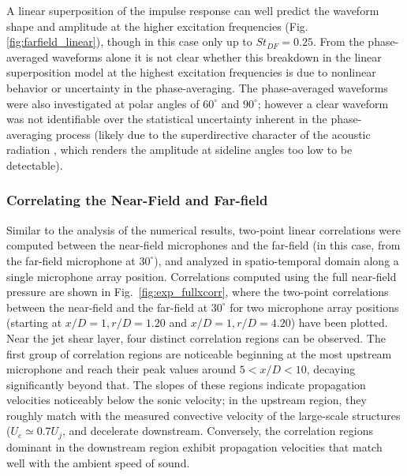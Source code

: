 \documentclass[english]{aiaa-tc}
\newcommand*{\fig}[1]{Fig.~\ref{#1}}
\begin{document}
A linear superposition of the impulse response can well predict the waveform shape and amplitude at the higher excitation frequencies (Fig. \ref{fig:farfield_linear}), though in this case only up to $St_{DF}  = 0.25$.
From the phase-averaged waveforms alone it is not clear whether this breakdown in the linear superposition model at the highest excitation frequencies is due to nonlinear behavior or uncertainty in the phase-averaging.
The phase-averaged waveforms were also investigated at polar angles of $60^\circ$ and $90^\circ$; however a clear waveform was not identifiable over the statistical uncertainty inherent in the phase-averaging process (likely due to the superdirective character of the acoustic radiation \cite{Crighton1990}, which renders the amplitude at sideline angles too low to be detectable).

\subsubsection{Correlating the Near-Field and Far-field}
Similar to the analysis of the numerical results, two-point linear correlations were computed between the near-field microphones and the far-field (in this case, from the far-field microphone at $30^{\circ}$), and analyzed in spatio-temporal domain along a single microphone array position.
Correlations computed using the full near-field pressure are shown in \fig{fig:exp_fullxcorr}, where the two-point correlations between the near-field and the far-field at $30^\circ$ for two microphone array positions (starting at $x/D = 1, r/D = 1.20$ and $x/D = 1, r/D = 4.20$) have been plotted.
Near the jet shear layer, four distinct correlation regions can be observed. 
The first group of correlation regions are noticeable beginning at the most upstream microphone and reach their peak values around $5 < x/D < 10$, decaying significantly beyond that.
The slopes of these regions indicate propagation velocities noticeably below the sonic velocity; in the upstream region, they roughly match with the measured convective velocity of the large-scale structures ($U_c \simeq 0.7 U_j$, and decelerate downstream.
Conversely, the correlation regions dominant in the downstream region exhibit propagation velocities that match well with the ambient speed of sound. 
\end{document}
